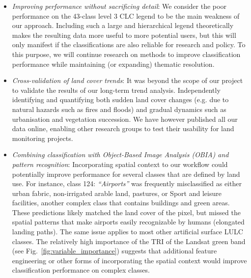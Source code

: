 \begin{itemize}
\item \emph{Improving performance without sacrificing detail}: We consider the poor performance on the 43-class level 3 CLC legend to be the main weakness of our approach. Including such a large and hierarchical legend theoretically makes the resulting data more useful to more potential users, but this will only manifest if the classifications are also reliable for research and policy. To this purpose, we will continue research on methods to improve classification performance while maintaining (or expanding) thematic resolution.

\item \emph{Cross-validation of land cover trends}: It was beyond the scope of our project to validate the results of our long-term trend analysis. Independently identifying and quantifying both sudden land cover changes (e.g. due to natural hazards such as fires and floods) and gradual dynamics such as urbanisation and vegetation succession. We have however published all our data online, enabling other research groups to test their usability for land monitoring projects.

\item \emph{Combining classification with Object-Based Image Analysis (OBIA) and pattern recognition}: Incorporating spatial context to our workflow could potentially improve performance for several classes that are defined by land use. For instance, class 124: \emph{``Airports''} was frequently misclassified as either urban fabric, non-irrigated arable land, pastures, or Sport and leisure facilities, another complex class that contains buildings and green areas. These predictions likely matched the land cover of the pixel, but missed the spatial patterns that make airports easily recognizable by humans (elongated landing paths). The same issue applies to most other artificial surface LULC classes. The relatively high importance of the TRI of the Landsat green band (see Fig.\@~\ref{fig:variable_importance}) suggests that additional feature engineering or other forms of incorporating the spatial context would improve classification performance on complex classes.
\end{itemize}

